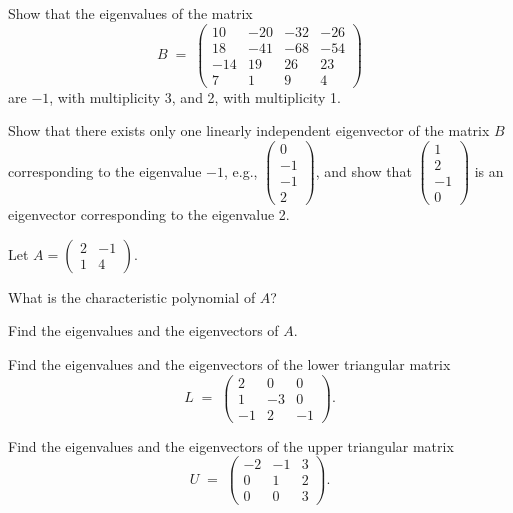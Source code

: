 \begin{exercises}
\begin{subparts}
\item Show that the eigenvalues of the matrix
\[
B \;=\; \begin{pmatrix} 10 & -20 & -32 & -26\\ 18 & -41 & -68 & -54\\ -14 & 19 & 26 & 23\\ 7 & 1 & 9 & 4 \end{pmatrix}
\]
are $-1$, with multiplicity 3, and 2, with multiplicity 1.

Show that there exists only one linearly independent eigenvector of the
matrix $B$ corresponding to the eigenvalue $-1$, e.g.,
$\begin{pmatrix} 0\\ -1\\ -1\\ 2 \end{pmatrix}$, and show that
$\begin{pmatrix} 1\\ 2\\ -1\\ 0 \end{pmatrix}$ is an eigenvector corresponding
to the eigenvalue 2.
\end{subparts}

\item Let $A = \begin{pmatrix} 2 & -1\\ 1 & 4 \end{pmatrix}$.
\begin{subparts}
\item What is the characteristic polynomial of $A$?
\item Find the eigenvalues and the eigenvectors of $A$.
\end{subparts}

\item
\begin{subparts}
\item Find the eigenvalues and the eigenvectors of the lower triangular
matrix
\[
L \;=\; \begin{pmatrix} 2 & 0 & 0\\ 1 & -3 & 0\\ -1 & 2 & -1 \end{pmatrix}.
\]
\item Find the eigenvalues and the eigenvectors of the upper triangular
matrix
\[
U \;=\; \begin{pmatrix} -2 & -1 & 3\\ 0 & 1 & 2\\ 0 & 0 & 3 \end{pmatrix}.
\]
\end{subparts}


\end{exercises}
